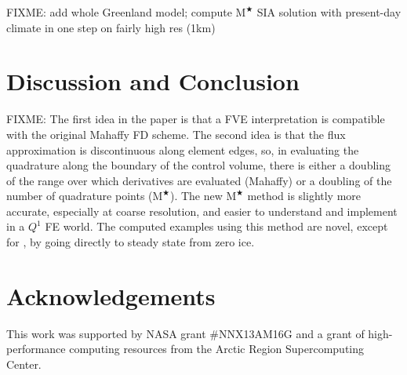 \documentclass[twocolumn,letterpaper]{igs}
\newcommand{\Mstar}{$\text{M}^{\bigstar}$\xspace}
\begin{document}
FIXME: add whole Greenland model; compute \Mstar SIA solution with present-day climate in one step on fairly high res (1km)


\section{Discussion and Conclusion} \label{sec:conclusion}

FIXME: The first idea in the paper is that a FVE interpretation is compatible with the original Mahaffy FD scheme.  The second idea is that the flux approximation is discontinuous along element edges, so, in evaluating the quadrature along the boundary of the control volume, there is either a doubling of the range over which derivatives are evaluated (Mahaffy) or a doubling of the number of quadrature points (\Mstar).  The new \Mstar method is slightly more accurate, especially at coarse resolution, and easier to understand and implement in a $Q^1$ FE world.  The computed examples using this method are novel, except for \cite{JouvetBueler2012}, by going directly to steady state from zero ice.

\section*{Acknowledgements}
This work was supported by NASA grant \#NNX13AM16G and a grant of high-performance computing resources from the Arctic Region Supercomputing Center.






\begin{comment}
Here is what the MPAS Land-Ice User's Manual version 3.0 says:

\begin{quote}
\small
Velocities and fluxes are calculated on the midpoint of Voronoi cell edges.  The normal component of surface slope is calculated on cell edges using surface elevation at adjacent cell centers.  The tangential component of surface slope is calculated on cell edges using surface elevation at adjacent vertices. The surface elevation at vertices is calculated from the values at adjacent cell centers using barycentric interpolation. Ice thickness on edges is calculated as the average of the adjacent cell center values (2nd-order approximation).
\end{quote}

Looking at this, and the code, I don't think they think of it as Petrov-Galerkin
\end{comment}
\end{document}
